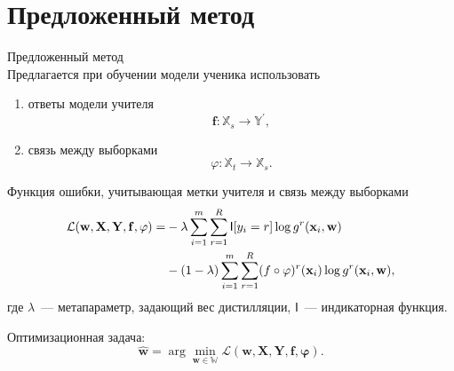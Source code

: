 \documentclass[10pt,pdf,hyperref={unicode}]{beamer}
\begin{document}
\section{Предложенный метод}
\begin{frame}{Предложенный метод}
~\\[-1mm]
Предлагается при обучении модели ученика использовать
\begin{enumerate}[1)]
	\item ответы модели учителя 
	$$\mathbf{f}: \mathbb{X}_{s} \rightarrow \mathbb{Y}^{\prime},$$
	\item связь между выборками
	$$\varphi: \mathbb{X}_{t} \rightarrow \mathbb{X}_{s}.$$
\end{enumerate}

\medskip
Функция ошибки, учитывающая метки учителя и связь между выборками
\[
\setlength\abovedisplayskip{0pt}
\begin{aligned}
    \mathcal{L}(\mathbf{w,X,Y,f,\varphi})=&-\lambda\sum\limits_{i=1}^{m}\sum\limits_{r=1}^{R}\mathsf{I}[y_{i}=r]\log{g^{r}(\mathbf{x}_{i},\mathbf{w})}\\
    &-(1-\lambda)\sum\limits_{i=1}^{m}\sum\limits_{r=1}^{R}(f\circ \varphi)^{r}(\mathbf{x}_{i})\log{g^{r}(\mathbf{x}_{i},\mathbf{w})},
\end{aligned}
\setlength\belowdisplayskip{0pt}
\]
где $\lambda$~--- метапараметр, задающий вес дистилляции, $\mathsf{I}$~--- индикаторная функция.

Оптимизационная задача:
\[
\hat{\mathbf{w}} = \arg\min_{\mathbf{w} \in \mathbb{W}} \mathcal{L}(\mathbf{w,X,Y,f,\varphi}).
\]

\end{frame}

\end{document}
